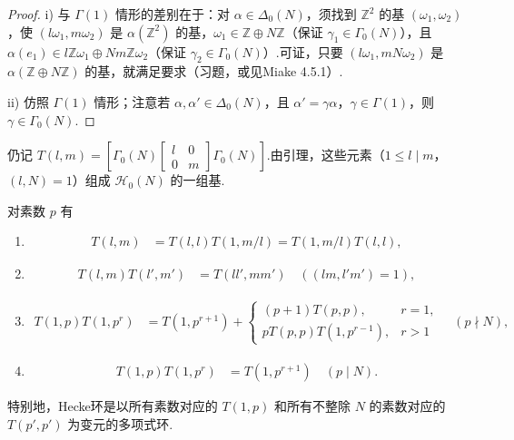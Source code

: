 \begin{proof}

i) 与 $\Gamma(1)$ 情形的差别在于：对 $\alpha\in\Delta_0(N)$，须找到 $\mathbb Z^2$ 的基 $(\omega_1,\omega_2)$，使 $(l\omega_1,m\omega_2)$ 是 $\alpha(\mathbb Z^2)$ 的基，$\omega_1\in\mathbb Z\oplus N\mathbb Z$（保证 $\gamma_1\in\Gamma_0(N)$），且 $\alpha(e_1)\in l\mathbb Z\omega_1\oplus Nm\mathbb Z\omega_2$（保证 $\gamma_2\in\Gamma_0(N)$）.可证，只要 $(l\omega_1,mN\omega_2)$ 是 $\alpha(\mathbb Z\oplus N\mathbb Z)$ 的基，就满足要求（习题，或见Miake 4.5.1）.

ii) 仿照 $\Gamma(1)$ 情形；注意若 $\alpha,\alpha'\in\Delta_0(N)$，且 $\alpha'=\gamma\alpha$，$\gamma\in\Gamma(1)$，则 $\gamma\in\Gamma_0(N)$.

\end{proof}

仍记 $T(l,m)=[\Gamma_0(N)\left[\begin{smallmatrix}l&0\\0&m\end{smallmatrix}\right]\Gamma_0(N)]$.由引理，这些元素（$1\le l\mid m$，$(l,N)=1$）组成 $\mathcal H_0(N)$ 的一组基.

\begin{proposition*}

对素数 $p$ 有

\begin{enumerate}[label=\roman*)]
\item
\begin{align*}
T(l,m)&=T(l,l)T(1,m/l)=T(1,m/l)T(l,l),
\end{align*}
\item
\begin{align*}
T(l,m)T(l',m')&=T(ll',mm')\quad((lm,l'm')=1),
\end{align*}
\item
\begin{align*}
T(1,p)T(1,p^r)&=T(1,p^{r+1})+\begin{cases}(p+1)T(p,p),&r=1,\\pT(p,p)T(1,p^{r-1}),&r>1\end{cases}\quad(p\nmid N),
\end{align*}
\item
\begin{align*}
T(1,p)T(1,p^r)&=T(1,p^{r+1})\quad(p\mid N).
\end{align*}
\end{enumerate}

特别地，Hecke环是以所有素数对应的 $T(1,p)$ 和所有不整除 $N$ 的素数对应的 $T(p',p')$ 为变元的多项式环.

\end{proposition*}

